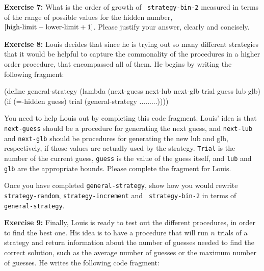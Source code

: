 %


{\bf Exercise 7:}  What is the order of growth of {\tt
strategy-bin-2} measured in terms of the range of possible values
for the hidden number, $[\hbox{\rm high-limit} - \hbox{\rm lower-limit}
+1]$.  Please justify your answer, clearly and concisely.


{\bf Exercise 8:}  Louis decides that since he is trying out so many
different strategies that it would be helpful to capture the commonality
of the procedures in a higher order procedure, that encompassed all of
them.  He begins by writing the following fragment:

\beginlisp
(define general-strategy
  (lambda (next-guess next-lub next-glb trial guess lub glb)
    (if (=-hidden guess)
        trial
        (general-strategy .........))))
\endlisp

You need to help Louis out by completing this code fragment.  Louis'
idea is that {\tt next-guess} should be a procedure for generating the
next guess, and {\tt next-lub} and {\tt next-glb} should be
procedures for generating the new lub and glb, respectively, if those
values are actually used by the strategy. {\tt Trial} is the number of
the current guess, {\tt guess} is the value of the guess itself, and
{\tt lub} and {\tt glb} are the appropriate bounds.  Please complete the
fragment for Louis.

%

Once you have completed {\tt general-strategy}, show how you would
rewrite {\tt strategy-random}, {\tt strategy-increment} and {\tt
strategy-bin-2} in terms of {\tt general-strategy}.

{\bf Exercise 9:}  Finally, Louis is ready to test out the different
procedures, in order to find the best one.  His idea is to have a
procedure that will run $n$ trials of a strategy and return information
about the number of guesses needed to find the correct solution, such as
the average number of guesses or the maximum number of guesses.  He writes the 
following code fragment:   

